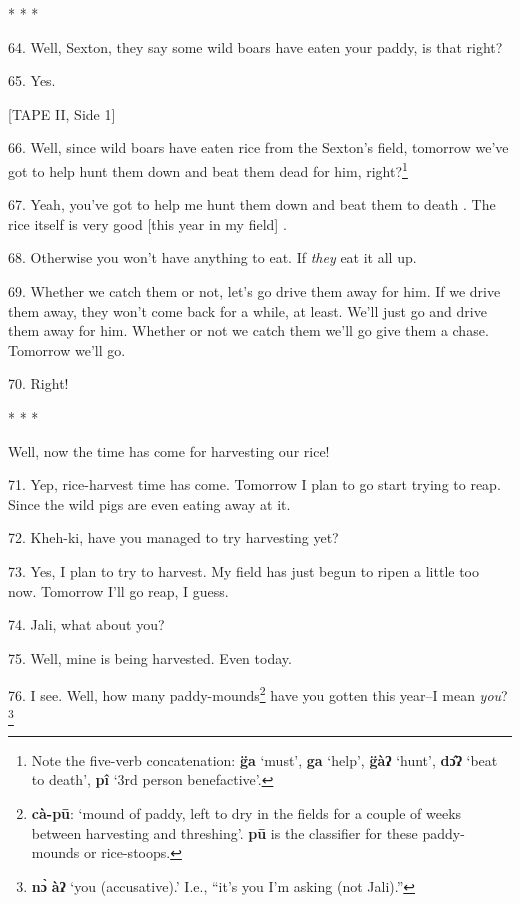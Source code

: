 \begin{center}
* * *
\end{center}

64. Well, Sexton, they say some wild boars have eaten your paddy, is that right?

65. Yes.

[TAPE II, Side 1]

66. Well, since wild boars have eaten rice from the Sexton's field, tomorrow we've
got to help hunt them down and beat them dead for him, right?\footnote{Note the five-verb concatenation: \textbf{g̈a} `must', \textbf{ga} `help', \textbf{g̈àʔ} `hunt', \textbf{dɔ̂ʔ} `beat to death', \textbf{pî} `3rd person benefactive'.}

67. Yeah, you've got to help me hunt them down and beat them to death . The rice
itself is very good [this year in my field] .

68. Otherwise you won't have anything to eat. If \textit{they} eat it all up.

69. Whether we catch them or not, let's go drive them away for him. If we drive
them away, they won't come back for a while, at least. We'll just go and drive
them away for him. Whether or not we catch them we'll go give them a chase. Tomorrow
we'll go.

70. Right!

\begin{center}
* * *
\end{center}

Well, now the time has come for harvesting our rice!

71. Yep, rice-harvest time has come. Tomorrow I plan to go start trying to reap.
Since the wild pigs are even eating away at it.

72. Kheh-ki, have you managed to try harvesting yet?

73. Yes, I plan to try to harvest. My field has just begun to ripen a little too
now. Tomorrow I'll go reap, I guess.

74. Jali, what about you?

75. Well, mine is being harvested. Even today.

76. I see. Well, how many paddy-mounds\footnote{\textbf{cà-pū}: `mound of paddy, left to dry in the fields for a couple of weeks between harvesting and threshing'. \textbf{pū} is the classifier for these paddy-mounds or rice-stoops.} have you gotten this year--I mean \emph{you}?\footnote{\textbf{nɔ̀} \textbf{àʔ} `you (accusative).' I.e., ``it's you I'm asking (not Jali).''}

